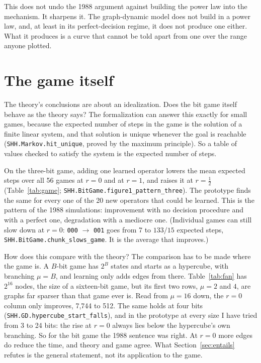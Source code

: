 \documentclass[11pt]{article}
\newcommand{\lean}[1]{\texttt{#1}}
\newcommand{\code}[1]{\texttt{#1}}
\begin{document}
This does not undo the 1988 argument against building the power law into
the mechanism. It sharpens it. The graph-dynamic model does not build in a
power law, and, at least in its perfect-decision regime, it does not
produce one either. What it produces is a curve that cannot be told apart
from one over the range anyone plotted.

\section{The game itself}
\label{sec:game}

The theory's conclusions are about an idealization. Does the bit game
itself behave as the theory says? The
formalization can answer this exactly for small games, because the expected
number of steps in the game is the solution of a finite linear system, and
that solution is unique whenever the goal is reachable
(\lean{SHH.Markov.hit\_unique}, proved by the maximum principle). So a table
of values checked to satisfy the system is the expected number of steps.

On the three-bit game, adding one learned operator lowers the mean expected
steps over all 56 games at $r = 0$ and at $r = 1$, and raises it at
$r = \tfrac12$ (Table~\ref{tab:game}; \lean{SHH.BitGame.figure1\_pattern\_three}).
The prototype finds the same for every one of the 20 new operators that
could be learned. This is the pattern of the 1988 simulations: improvement
with no decision procedure and with a perfect one, degradation with a
mediocre one. (Individual games can still slow down at $r = 0$: \code{000}
$\to$ \code{001} goes from 7 to $133/15$ expected steps,
\lean{SHH.BitGame.chunk\_slows\_game}. It is the average that improves.)

How does this compare with the theory? The comparison has to be made
where the game is. A $B$-bit game has $2^B$ states and starts as a
hypercube, with branching $\mu = B$, and learning only adds edges from
there. Table~\ref{tab:fan} has $2^{16}$ nodes, the size of a sixteen-bit
game, but its first two rows, $\mu = 2$ and $4$, are graphs far sparser
than that game ever is. Read from $\mu = 16$ down, the $r = 0$ column only
improves, 7{,}744 to 512. The same holds at four bits
(\lean{SHH.GD.hypercube\_start\_falls}), and in the prototype at every size
I have tried from 3 to 24 bits: the rise at $r = 0$ always lies below the
hypercube's own branching. So for the bit game the 1988 sentence was right.
At $r = 0$ more edges do reduce the time, and theory and game agree. What
Section~\ref{sec:entails} refutes is the general statement, not its
application to the game.
\end{document}
